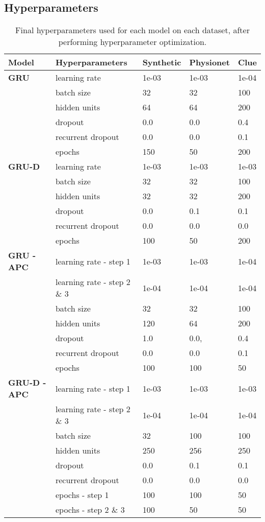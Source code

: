 \documentclass{article}
\begin{document}
\subsection{\large Hyperparameters}
\vspace{1cm}
\begin{table*}[h]
\caption{\label{tab:chosen_hyperparameters} Final hyperparameters used for each model on each dataset, after performing hyperparameter optimization.}
\centering
\setlength{\tabcolsep}{10pt}
\begin{tabular}{lllll}
\toprule
{\textbf{Model}} & {Hyperparameters} & {Synthetic} & {Physionet} & {Clue} \\
\midrule
{\textbf{GRU}} & learning rate & 1e-03 & 1e-03 &  1e-04    \\
 & batch size  & 32 &   32  &   100\\
 & hidden units & 64 & 64 &   200\\
 & dropout & 0.0 &  0.0 &  0.4 \\
 & recurrent dropout & 0.0 &  0.0 & 0.1 \\
 & epochs & 150 &  50 & 200\\
\hline
{\textbf{GRU-D}} & learning rate & 1e-03 &  1e-03 & 1e-03 \\
& batch size  & 32 & 32 &  100 \\
& hidden units & 32 & 32 &  200\\
& dropout & 0.0 &  0.1 & 0.1 \\
& recurrent dropout & 0.0 &  0.0 &  0.0\\
& epochs & 100 &  50 & 200\\
\hline
{\textbf{GRU - APC}} & learning rate - step 1 & 1e-03 &  1e-03 &  1e-04 \\
& learning rate - step 2 $\&$ 3 & 1e-04 & 1e-04 &  1e-04   \\
& batch size & 32 &   32 &  100 \\
& hidden units & 120 &   64 &  200 \\
& dropout & 1.0 & 0.0,  & 0.4 \\
& recurrent dropout & 0.0 &  0.0 &  0.1\\
& epochs & 100 &  100 & 50\\
\hline
{\textbf{GRU-D - APC}} & learning rate - step 1 & 1e-03 &  1e-03 & 1e-03  \\
& learning rate - step 2 $\&$ 3 & 1e-04 & 1e-04 & 1e-04  \\
& batch size & 32 &  100 &  100  \\
& hidden units & 250 &  256  &  250 \\
& dropout & 0.0 & 0.1 &  0.1 \\
& recurrent dropout & 0.0 &  0.0 & 0.0 \\
& epochs - step 1 & 100 &  100 & 50\\
& epochs - step 2 $\&$ 3 & 100 &  50  &  50\\
\bottomrule 
\end{tabular}
\end{table*}
\end{document}
